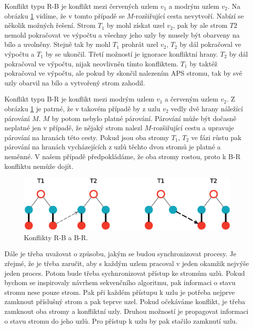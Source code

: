\documentclass[a4paper, 11pt, titlepage, final]{article}[3. prosinec 2011]
\begin{document}
Konflikt typu R-B je konflikt mezi červených uzlem $v_1$ a modrým uzlem $v_2$. Na obrázku \ref{imgXY} vidíme, že v tomto případě se $M$-rozšiřující cesta nevytvoří. Nabízí se několik možných řešení. Strom $T_1$ by mohl získat uzel $v_2$, pak by ale strom $T2$ nemohl pokračovat ve výpočtu a všechny jeho uzly by musely být obarveny na bílo a uvolněny. Stejně tak by mohl $T_1$ prohrát uzel $v_2$, $T_2$ by dál pokračoval ve výpočtu a $T_1$ by se ukončil. Třetí možností je ignorace konfliktní hrany. $T_2$ by dál pokračoval ve výpočtu, nijak neovlivněn tímto konfliktem. $T_1$ by taktéž pokračoval ve výpočtu, ale pokud by skončil nalezením APS stromu, tak by své uzly obarvil na bílo a vytvořený strom zahodil.

Konflikt typu B-R je konflikt mezi modrým uzlem $v_1$ a červeným uzlem $v_2$. Z obrázku \ref{imgXY} je patrné, že v takovém případě by z uzlu $v_2$ vedly dvě hrany náležící párování $M$. $M$ by potom nebylo platné párování. Párování může být dočasně neplatné jen v případě, že nějaký strom nalezl $M$-rozšiřující cestu a upravuje párování na hranách této cesty. Pokud jsou oba stromy $T_1$, $T_2$ ve fázi růstu pak párování na hranách vycházejících z uzlů těchto dvou stromů je platné a neměnné. V našem případě předpokládáme, že oba stromy rostou, proto k B-R konfliktu nemůže dojít.

\begin{figure}[ht]
  \centering
  \includegraphics[scale=0.5]{img/XYconflicts.eps}
  \caption{Konflikty R-B a B-R.}
  \label{imgXY}
\end{figure}

Dále je třeba uvažovat o způsobu, jakým se budou synchronizovat procesy. Je zřejmé, že je třeba zaručit, aby s každým uzlem pracoval v jeden okamžik nejvýše jeden proces. Potom bude třeba sychnronizovat přístup ke stromům uzlů. Pokud bychom se inspirovaly návrhem sekvenčního algoritmu, pak informaci o stavu stromu nese pouze strom. Pak při každém přístupu k uzlu je potřeba nejprve zamknout příslušný strom a pak teprve uzel. Pokud očekáváme konflikt, je třeba zamknout oba stromy a konfliktní uzly. Druhou možností je propagovat informaci o stavu stromu do jeho uzlů. Pro přístup k uzlu by pak stačilo zamknutí uzlu.
\end{document}
